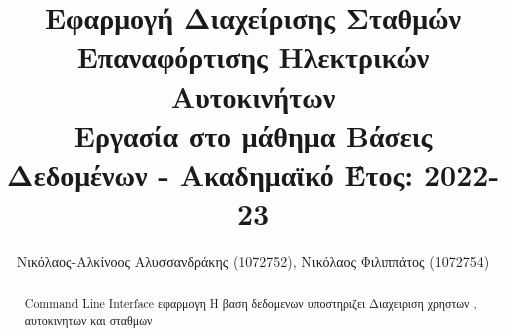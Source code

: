 \documentclass[manuscript,screen,review]{acmart}
\newcommand{\en}[1]{\foreignlanguage{english}{#1}}
\begin{document}
\title{Εφαρμογή Διαχείρισης Σταθμών Επαναφόρτισης Ηλεκτρικών Αυτοκινήτων  \\ Εργασία στο μάθημα Βάσεις Δεδομένων - Ακαδημαϊκό Έτος: 2022-23}





\author{Νικόλαος-Αλκίνοος Αλυσσανδράκης (1072752), Νικόλαος Φιλιππάτος (1072754)}



\begin{abstract}
\newline
 \en{Command Line Interface } εφαρμογη 
 Η βαση δεδομενων υποστηριζει 
 Διαχειριση χρηστων , αυτοκινητων και σταθμων 

 \end{abstract}




\maketitle
\end{document}
